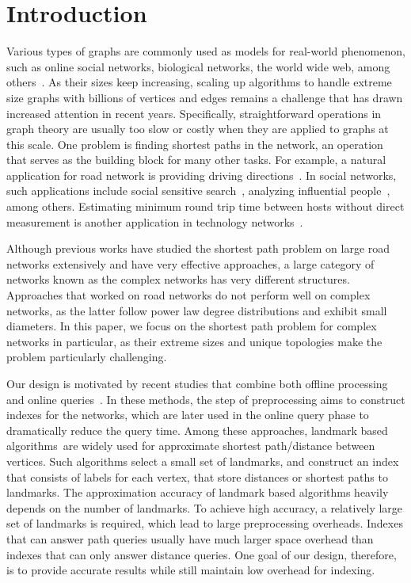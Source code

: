 \section{Introduction}
\label{introduction}

Various types of graphs are commonly used as models for real-world phenomenon, such as online social networks, biological networks, the world wide web, among others~\cite{newman2010networks}. As their sizes keep increasing, scaling up algorithms to handle extreme size graphs with billions of vertices and edges remains a challenge that has drawn increased attention in recent years. Specifically, straightforward operations in graph theory are usually too slow or costly when they are applied to graphs at this scale. One problem is finding shortest paths in the network, an operation that serves as the building block for many other tasks. For example, a natural application for road network is providing driving directions~\cite{Abraham:2011:HLA:2008623.2008645}. In social networks, such applications include social sensitive search~\cite{Vieira:2007:ESR:1321440.1321520}, analyzing influential people~\cite{Kempe:2003:MSI:956750.956769}, among others. Estimating minimum round trip time between hosts without direct measurement is another application in technology networks~\cite{Tang:2003:VLI:948205.948223}.

Although previous works have studied the shortest path problem on large road networks extensively and have very effective approaches, a large category of networks known as the complex networks has very different structures. Approaches that worked on road networks do not perform well on complex networks, as the latter follow power law degree distributions and exhibit small diameters. In this paper, we focus on the shortest path problem for complex networks in particular, as their extreme sizes and unique topologies make the problem particularly challenging.

Our design is motivated by recent studies that combine both offline processing and online queries~\cite{Potamias:2009:FSP:1645953.1646063, tretyakov2011fast, Akiba:2012:SQC:2247596.2247614, 6399472, Jin:2012:HLA:2213836.2213887}. In these methods, the step of preprocessing aims to construct indexes for the networks, which are later used in the online query phase to dramatically reduce the query time. Among these approaches, landmark based algorithms~\cite{Thorup:2005:ADO:1044731.1044732, Goldberg:2005:CSP:1070432.1070455, Potamias:2009:FSP:1645953.1646063, Gubichev:2010:FAE:1871437.1871503, tretyakov2011fast, 6399472}are widely used for approximate shortest path/distance between vertices. Such algorithms select a small set of landmarks, and construct an index that consists of labels for each vertex, that store distances or shortest paths to landmarks. The approximation accuracy of landmark based algorithms heavily depends on the number of landmarks. To achieve high accuracy, a relatively large set of landmarks is required, which lead to large preprocessing overheads. Indexes that can answer path queries usually have much larger space overhead than indexes that can only answer distance queries. One goal of our design, therefore, is to provide accurate results while still maintain low overhead for indexing.

